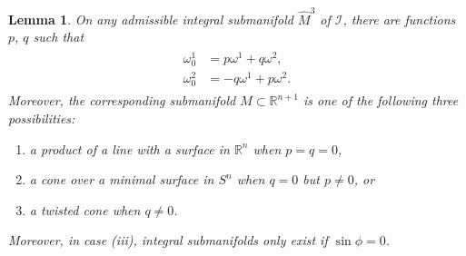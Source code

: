 \documentclass[pdftex]{sigma}
\def\R{\mathbb{R}}
\def\calI{\mathcal{I}}
\def\w{\omega}
\def\Mhat{\widehat{M}}
\newtheorem{Lemma}[Theorem]{Lemma}
\numberwithin{equation}{section}
\begin{document}
\begin{Lemma} \label{pqprolong}
On any admissible integral submanifold $\Mhat^3$ of $\calI$, there are functions $p$, $q$ such that
\begin{gather} \label{austpq}
\begin{aligned}
\w^1_0 &= p \w^1 + q \w^2,
\\
\w^2_0 &= -q \w^1 + p \w^2.
\end{aligned}
\end{gather}
Moreover, the corresponding submanifold $M \subset \R^{n+1}$ is one of the following three possibilities:
\begin{enumerate}[$(i)$]\itemsep=0pt
\item a product of a line with a surface in $\R^n$ when $p=q=0$,
\item a cone over a minimal surface in $S^n$ when $q=0$ but $p\ne0$, or
\item a twisted cone when $q\ne 0$.
\end{enumerate}
Moreover, in case (iii), integral submanifolds only exist if $\sin\phi =0$.
\end{Lemma}
\end{document}
